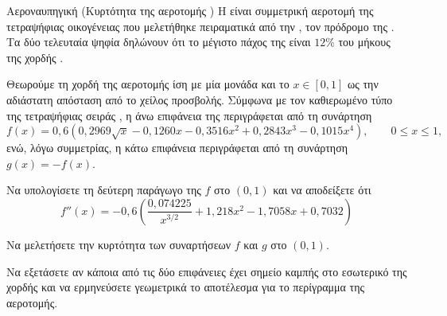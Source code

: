\begin{problhma}{Αεροναυπηγική (Κυρτότητα της αεροτομής )}
Η  είναι συμμετρική αεροτομή της τετραψήφιας
οικογένειας που μελετήθηκε πειραματικά από την , τον πρόδρομο
της . Τα δύο τελευταία ψηφία δηλώνουν ότι το μέγιστο πάχος της
είναι $12\%$ του μήκους της χορδής \cite{jacobs1933naca460}.

Θεωρούμε τη χορδή της αεροτομής ίση με μία μονάδα και το $x\in[0,1]$ ως
την αδιάστατη απόσταση από το χείλος προσβολής. Σύμφωνα με τον
καθιερωμένο τύπο της τετραψήφιας σειράς , η άνω επιφάνεια της
 περιγράφεται από τη συνάρτηση
\[
f(x)=0{,}6\left(
0{,}2969\sqrt{x}-0{,}1260x-0{,}3516x^2
+0{,}2843x^3-0{,}1015x^4
\right),
\qquad 0\leq x\leq 1,
\]
ενώ, λόγω συμμετρίας, η κάτω επιφάνεια περιγράφεται από τη συνάρτηση
$g(x)=-f(x)$.

\begin{alist}
\item Να υπολογίσετε τη δεύτερη παράγωγο της $f$ στο $(0,1)$ και να
      αποδείξετε ότι
      \[
      f''(x)=-0{,}6\left(
      \frac{0{,}074225}{x^{3/2}}
      +1{,}218x^2-1{,}7058x+0{,}7032
      \right)
      \]
\item Να μελετήσετε την κυρτότητα των συναρτήσεων $f$ και $g$ στο
      $(0,1)$.
\item Να εξετάσετε αν κάποια από τις δύο επιφάνειες έχει σημείο καμπής
      στο εσωτερικό της χορδής και να ερμηνεύσετε γεωμετρικά το
      αποτέλεσμα για το περίγραμμα της αεροτομής.
\end{alist}

\begin{center}
\end{center}
\end{problhma}
